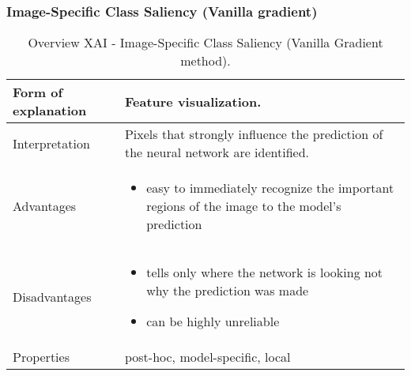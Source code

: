 \subsubsection{Image-Specific Class Saliency (Vanilla gradient)}
\begin{table}[H]
  \centering
  \begin{tabular}{|p{}|p{}|}
    \hline
    Form of \newline explanation & 
    Feature visualization. \\
    
    \hline
    Interpretation & 
    Pixels that strongly influence the prediction of the neural network are identified. \\
    \hline
    Advantages &
    \begin{itemize}[nosep, left=0em]
        \item easy to immediately recognize the important regions of the image to the model's prediction
    \end{itemize} \\
    
    \hline
    Disadvantages &
    \begin{itemize}[nosep, left=0em]
        \item tells only where the network is looking not why the prediction was made
        \item can be highly unreliable
    \end{itemize} \\
    
    \hline
    Properties & 
    post-hoc, model-specific, local  \\
    
    \hline
  \end{tabular}
  \caption[Overview XAI - Image-Specific Class Saliency (Vanilla Gradient method)]{Overview XAI - Image-Specific Class Saliency (Vanilla Gradient method).}
\end{table}
